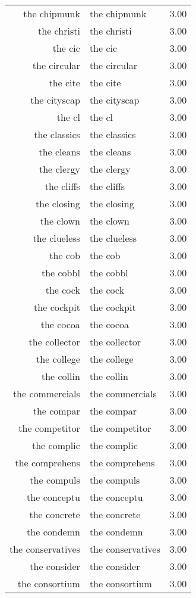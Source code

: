 \begin{table}[ht]
\begin{tabular}{rlr}
  the chipmunk & the chipmunk & 3.00 \\ 
  the christi & the christi & 3.00 \\ 
  the cic & the cic & 3.00 \\ 
  the circular & the circular & 3.00 \\ 
  the cite & the cite & 3.00 \\ 
  the cityscap & the cityscap & 3.00 \\ 
  the cl & the cl & 3.00 \\ 
  the classics & the classics & 3.00 \\ 
  the cleans & the cleans & 3.00 \\ 
  the clergy & the clergy & 3.00 \\ 
  the cliffs & the cliffs & 3.00 \\ 
  the closing & the closing & 3.00 \\ 
  the clown & the clown & 3.00 \\ 
  the clueless & the clueless & 3.00 \\ 
  the cob & the cob & 3.00 \\ 
  the cobbl & the cobbl & 3.00 \\ 
  the cock & the cock & 3.00 \\ 
  the cockpit & the cockpit & 3.00 \\ 
  the cocoa & the cocoa & 3.00 \\ 
  the collector & the collector & 3.00 \\ 
  the college & the college & 3.00 \\ 
  the collin & the collin & 3.00 \\ 
  the commercials & the commercials & 3.00 \\ 
  the compar & the compar & 3.00 \\ 
  the competitor & the competitor & 3.00 \\ 
  the complic & the complic & 3.00 \\ 
  the comprehens & the comprehens & 3.00 \\ 
  the compuls & the compuls & 3.00 \\ 
  the conceptu & the conceptu & 3.00 \\ 
  the concrete & the concrete & 3.00 \\ 
  the condemn & the condemn & 3.00 \\ 
  the conservatives & the conservatives & 3.00 \\ 
  the consider & the consider & 3.00 \\ 
  the consortium & the consortium & 3.00 \\ 

\end{tabular}
\end{table}
